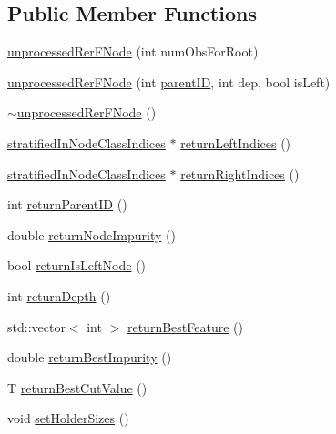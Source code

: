 \subsection*{Public Member Functions}
\begin{DoxyCompactItemize}
\item 
\hyperlink{classfp_1_1unprocessedRerFNode_a49970c4650bc7c448e29d6efd0dcfd34}{unprocessed\+Rer\+F\+Node} (int num\+Obs\+For\+Root)
\item 
\hyperlink{classfp_1_1unprocessedRerFNode_ab20dcd6c9729051144ac3013c7c8fd5d}{unprocessed\+Rer\+F\+Node} (int \hyperlink{classfp_1_1unprocessedRerFNode_ab87cfcf5df700dbc7ec02c87057b27aa}{parent\+ID}, int dep, bool is\+Left)
\item 
\hyperlink{classfp_1_1unprocessedRerFNode_a3316afcf52743fc7ade9ba8e0cdde2e2}{$\sim$unprocessed\+Rer\+F\+Node} ()
\item 
\hyperlink{classfp_1_1stratifiedInNodeClassIndices}{stratified\+In\+Node\+Class\+Indices} $\ast$ \hyperlink{classfp_1_1unprocessedRerFNode_a49c123f04f9c961e8d6142aa11200bcd}{return\+Left\+Indices} ()
\item 
\hyperlink{classfp_1_1stratifiedInNodeClassIndices}{stratified\+In\+Node\+Class\+Indices} $\ast$ \hyperlink{classfp_1_1unprocessedRerFNode_a4a8ede0f5b6e34c39bd10ce40ef1f110}{return\+Right\+Indices} ()
\item 
int \hyperlink{classfp_1_1unprocessedRerFNode_a94fadd35ce0d5c9bf446c3c9da534cbb}{return\+Parent\+ID} ()
\item 
double \hyperlink{classfp_1_1unprocessedRerFNode_a05ccccf919dec2285a31de5e47145b76}{return\+Node\+Impurity} ()
\item 
bool \hyperlink{classfp_1_1unprocessedRerFNode_acabfd0846277d68f05f3ba4ca639c29e}{return\+Is\+Left\+Node} ()
\item 
int \hyperlink{classfp_1_1unprocessedRerFNode_a37f1b49ac906ec2921365a35d1a5b96c}{return\+Depth} ()
\item 
std\+::vector$<$ int $>$ \hyperlink{classfp_1_1unprocessedRerFNode_a99927a98b98f2924f31cf03ece3b5d50}{return\+Best\+Feature} ()
\item 
double \hyperlink{classfp_1_1unprocessedRerFNode_a15b562553cf6417806ee8085ed4a1725}{return\+Best\+Impurity} ()
\item 
T \hyperlink{classfp_1_1unprocessedRerFNode_a87211d2d5ab3bc9f3de237870975e382}{return\+Best\+Cut\+Value} ()
\item 
void \hyperlink{classfp_1_1unprocessedRerFNode_a0fccfed626582cf730f6302fc2f703c4}{set\+Holder\+Sizes} ()

\end{DoxyCompactItemize}
